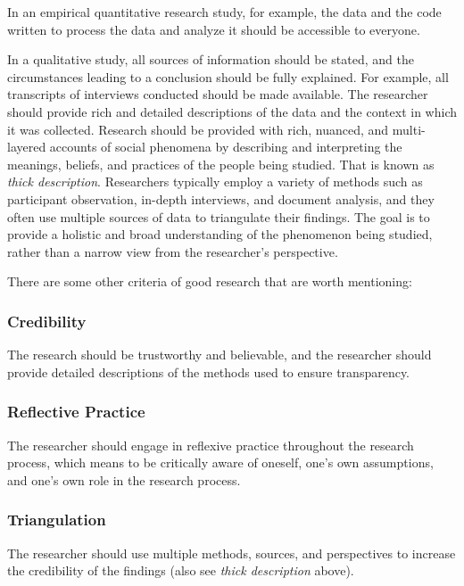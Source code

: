 \documentclass[
  12pt,
  oneside]{book}
\theoremstyle{definition}
\theoremstyle{definition}
\theoremstyle{definition}
\theoremstyle{definition}
\theoremstyle{remark}
\begin{document}
In an empirical quantitative research study, for example, the data and the code written to process the data and analyze it should be accessible to everyone.

In a qualitative study, all sources of information should be stated, and the circumstances leading to a conclusion should be fully explained. For example, all transcripts of interviews conducted should be made available. The researcher should provide rich and detailed descriptions of the data and the context in which it was collected. Research should be provided with rich, nuanced, and multi-layered accounts of social phenomena by describing and interpreting the meanings, beliefs, and practices of the people being studied. That is known as \emph{thick description}. Researchers typically employ a variety of methods such as participant observation, in-depth interviews, and document analysis, and they often use multiple sources of data to triangulate their findings. The goal is to provide a holistic and broad understanding of the phenomenon being studied, rather than a narrow view from the researcher's perspective.

There are some other criteria of good research that are worth mentioning:

\hypertarget{credibility}{%
\subsubsection*{Credibility}\label{credibility}}

The research should be trustworthy and believable, and the researcher should provide detailed descriptions of the methods used to ensure transparency.

\hypertarget{reflective-practice}{%
\subsubsection*{Reflective Practice}\label{reflective-practice}}

The researcher should engage in reflexive practice throughout the research process, which means to be critically aware of oneself, one's own assumptions, and one's own role in the research process.

\hypertarget{triangulation}{%
\subsubsection*{Triangulation}\label{triangulation}}

The researcher should use multiple methods, sources, and perspectives to increase the credibility of the findings (also see \emph{thick description} above).
\end{document}
